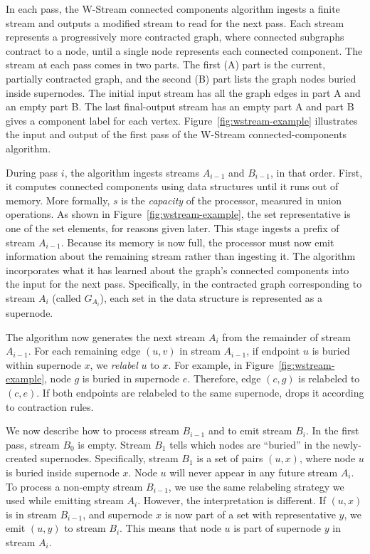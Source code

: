 In each pass, the W-Stream connected components algorithm ingests a finite stream and outputs a modified stream to read for the next pass. 
Each stream represents a progressively more contracted graph, where connected subgraphs contract to a node, until a single node represents each connected component. The stream at each pass comes in two parts. The first (A) part is the current, partially contracted graph, and the second (B) part lists the graph nodes buried inside supernodes. The initial input stream has all the graph edges in part A and an empty part B.  The last final-output stream has an empty part A and part B gives a component label for each vertex.
Figure~\ref{fig:wstream-example} illustrates the input and output of the first pass of the W-Stream connected-components algorithm.

During pass $i$, the algorithm ingests streams $A_{i-1}$ and $B_{i-1}$, in that order. 
First, it computes connected components using \uf
data structures until it runs out of memory.  More formally, $s$ is the
\emph{capacity} of the \WStream processor, measured in union operations. As shown in Figure~\ref{fig:wstream-example}, the set representative is one of the set elements, for reasons given later.
This \uf stage ingests a prefix of stream $A_{i-1}$.
Because its memory is now full, the processor must now emit information about the remaining stream rather than ingesting it. The algorithm incorporates what it has learned about the graph's connected components into the input for the next pass. Specifically, in the contracted graph corresponding to stream $A_i$ (called $G_{A_{i}}$), each set in the \uf data structure is represented as a supernode. 


The \DFR algorithm now generates the next stream $A_i$ from the remainder of stream $A_{i-1}$.
For each remaining edge $(u,v)$ in stream $A_{i-1}$, if endpoint $u$ is
buried within supernode $x$, we {\em relabel} $u$ to $x$. For example, 
in Figure~\ref{fig:wstream-example}, node $g$ is buried in supernode $e$.
Therefore, edge $(c,g)$ is relabeled to $(c,e)$.  If both endpoints are
relabeled to the same supernode, \DFR drops it according to contraction rules.

We now describe how to process stream $B_{i-1}$ and to emit stream $B_i$. In the first pass, stream $B_0$ is empty.  Stream $B_1$ tells which nodes are ``buried'' in the newly-created supernodes. Specifically, stream $B_1$ is a set of pairs $(u,x)$, where node $u$ is buried inside supernode $x$. Node $u$ will never appear in any future stream $A_i$. 
To process a non-empty stream $B_{i-1}$, we use the same relabeling strategy we used while emitting stream $A_i$.  However, the interpretation is different.  If $(u,x)$ is in stream $B_{i-1}$, and supernode $x$ is now part of a \uf set with representative $y$, we emit $(u,y)$ to stream $B_{i}$.  This means that node $u$ is part of supernode $y$ in stream $A_i$.

